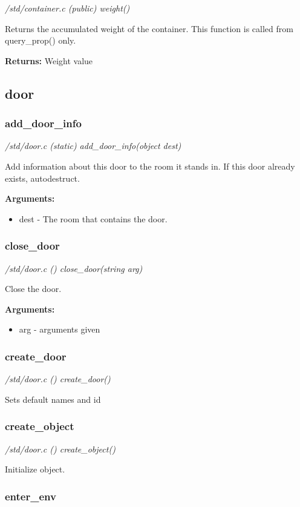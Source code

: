 {\em /std/container.c (public) weight()}

Returns the accumulated weight of the container.
This function is called from query\_prop() only.

{\bf Returns:}    Weight value


\subsection{door}
\subsubsection{add\_door\_info}

{\em /std/door.c (static) add\_door\_info(object dest)}

Add information about this door to the room it
stands in. If this door already exists, autodestruct.

{\bf Arguments:}
\begin{itemize}
\item     dest - The room that contains the door.
\end{itemize}


\subsubsection{close\_door}

{\em /std/door.c () close\_door(string arg)}

Close the door.

{\bf Arguments:}
\begin{itemize}
\item     arg - arguments given
\end{itemize}


\subsubsection{create\_door}

{\em /std/door.c () create\_door()}

Sets default names and id


\subsubsection{create\_object}

{\em /std/door.c () create\_object()}

Initialize object.


\subsubsection{enter\_env}


